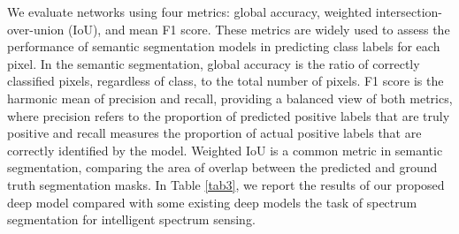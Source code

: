 \documentclass[journal]{IEEEtran} %
\begin{document}
We evaluate networks using four metrics: global accuracy, weighted intersection-over-union (IoU), and mean F1 score. These metrics are widely used to assess the performance of semantic segmentation models in predicting class labels for each pixel. In the semantic segmentation, global accuracy is the ratio of correctly classified pixels, regardless of class, to the total number of pixels. F1 score is the harmonic mean of precision and recall, providing a balanced view of both metrics, where precision refers to the proportion of predicted positive labels that are truly positive and recall measures the proportion of actual positive labels that are correctly identified by the model. Weighted IoU is a common metric in semantic segmentation, comparing the area of overlap between the predicted and ground truth segmentation masks. In Table \ref{tab3}, we report the results of our proposed deep model compared with some existing deep models the task of spectrum segmentation for intelligent spectrum sensing. 
\end{document}
